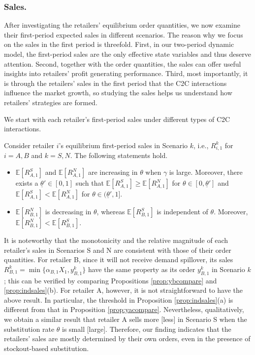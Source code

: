 \documentclass[nonblindrev,copyedit]{informs1}
\begin{document}
\subsubsection{Sales.}

After investigating the retailers' equilibrium order quantities, we now examine their first-period expected sales in different scenarios. The reason why we focus on the sales in the first period is threefold. First, in our two-period dynamic model, the first-period sales are the only effective state variables and thus deserve attention. Second, together with the order quantities, the sales can offer useful insights into retailers' profit generating performance. Third, most importantly, it is through the retailers' sales in the first period that the C2C interactions influence the market growth, so studying the sales helps us understand how retailers' strategies are formed.

We start with each retailer's first-period sales under different types of C2C interactions.
\begin{proposition}
\label{prop:indsales}
Consider retailer $i$'s equilibrium first-period sales in Scenario $k$, i.e., $R_{i,1}^k$ for $i=A,B$ and $k=S,N$. The following statements hold.
\begin{itemize}
\item[(a)] $\mathbb{E} [R^{S}_{A,1}]$ and $ \mathbb{E} [R^{N}_{A,1}]$ are increasing in $\theta$ when $\gamma$ is large. Moreover, there exists a $\underline{\theta}' \in [0,1]$ such that $\mathbb{E} [R^{S}_{A,1}] \geq \mathbb{E} [R^{N}_{A,1}]$ for $\theta \in [0,\underline{\theta}']$ and $\mathbb{E} [R^{S}_{A,1}] < \mathbb{E} [R^{N}_{A,1}]$ for $\theta \in (\underline{\theta}',1]$.
\item[(b)] $\mathbb{E}[R^N_{B,1}]$ is decreasing in $\theta$, whereas $\mathbb{E}[R^S_{B,1}]$ is independent of $\theta$. Moreover, $\mathbb{E}[R^N_{B,1}] < \mathbb{E}[R^S_{B,1}]$.
\end{itemize}
\end{proposition}

It is noteworthy that the monotonicity and the relative magnitude of each retailer's sales in Scenarios S and N are consistent with those of their order quantities. For retailer B, since it will not receive demand spillover, its sales $R_{B,1}^k=\min\{\alpha_{B,1}X_1, y_{B,1}^k\}$ have the same property as its order $y_{B,1}^k$ in Scenario $k$; this can be verified by comparing Propositions \ref{prop:ybcompare} and \ref{prop:indsales}(b).
For retailer A, however, it is not straightforward to have the above result. In particular, the threshold in Proposition \ref{prop:indsales}(a) is different from that in Proposition \ref{prop:yacompare}. Nevertheless, qualitatively, we obtain a similar result that retailer A sells more [less] in Scenario S when the substitution rate $\theta$ is small [large]. Therefore, our finding indicates that the retailers' sales are mostly determined by their own orders, even in the presence of stockout-based substitution.
\end{document}
